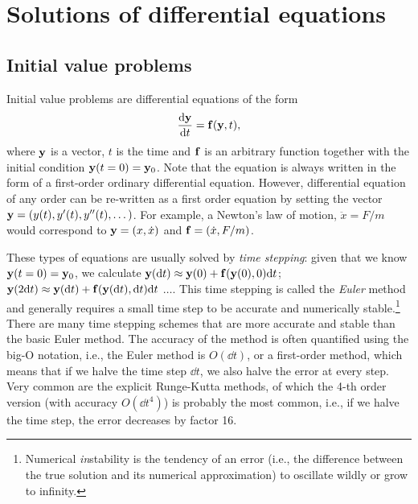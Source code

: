 \newpage
\section{Solutions of differential equations}
\subsection{Initial value problems}
Initial value problems are differential equations of the form
\begin{equation}
    \label{eq:ivp}
    \frac{\mathrm{d} {\mathbf{y}}}{\mathrm{d} {t}} = \mathbf{f}(\mathbf{y}, t),
\end{equation}
where $\mathbf{y}$ is a vector, $t$ is the time and $\bf f$ is an arbitrary function together with the initial condition $\mathbf{y}(t=0) = \mathbf{y}_0$. Note that the equation is always written in the form of a first-order ordinary differential equation. However, differential equation of any order can be re-written as a first order equation by setting the vector $\mathbf{y} = (y(t), y'(t), y''(t), \dots)$. For example, a Newton's law of motion, $\ddot x = F/m$ would correspond to $\mathbf{y} = (x, \dot x)$ and $\mathbf{f} = (\dot x, F/m)$.

These types of equations are usually solved by \emph{time stepping}: given that we know $\mathbf{y}(t=0) = \mathbf{y}_0$, we calculate $\mathbf{y}(\mathrm{d} t) \approx \mathbf{y}(0) + \mathbf{f}(\mathbf{y}(0), 0)\mathrm{d} t$; $\mathbf{y}(2\mathrm{d} t) \approx \mathbf{y}(\mathrm{d} t) + \mathbf{f}(\mathbf{y}(\mathrm{d} t), \mathrm{d} t)\mathrm{d} t$ $\dots$. This time stepping is called the \emph{Euler} method and generally requires a small time step to be accurate and numerically stable.\footnote{Numerical \emph{in}stability is the tendency of an error (i.e., the difference between the true solution and its numerical approximation) to oscillate wildly or grow to infinity.} There are many time stepping schemes that are more accurate and stable than the basic Euler method. The accuracy of the method is often quantified using the big-O notation, i.e., the Euler method is $O(\dd t)$, or a first-order method, which means that if we halve the time step $\dd t$, we also halve the error at every step. Very common are the explicit Runge-Kutta methods, of which the 4-th order version (with accuracy $O(\dd t^4)$) is probably the most common, i.e., if we halve the time step, the error decreases by factor 16.

